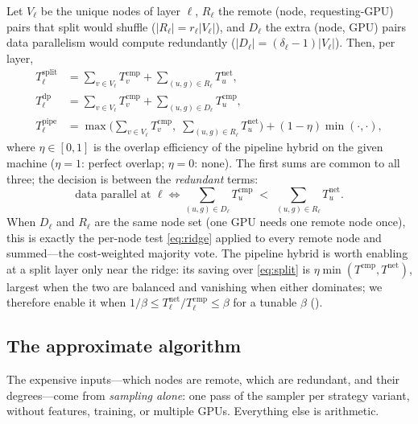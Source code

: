 Let $V_\ell$ be the unique nodes of layer $\ell$, $R_\ell$ the remote (node, requesting-GPU)
pairs that split would shuffle ($|R_\ell| = r_\ell |V_\ell|$), and $D_\ell$ the extra
(node, GPU) pairs data parallelism would compute redundantly
($|D_\ell| = (\delta_\ell - 1)|V_\ell|$). Then, per layer,
\begin{align}
  T^{\mathrm{split}}_\ell &= \sum_{v\in V_\ell} T^{\mathrm{cmp}}_v + \sum_{(u,g)\in R_\ell} T^{\mathrm{net}}_u, \label{eq:split}\\
  T^{\mathrm{dp}}_\ell    &= \sum_{v\in V_\ell} T^{\mathrm{cmp}}_v + \sum_{(u,g)\in D_\ell} T^{\mathrm{cmp}}_u, \label{eq:dp}\\
  T^{\mathrm{pipe}}_\ell  &= \max\!\Big(\sum_{v\in V_\ell} T^{\mathrm{cmp}}_v,\; \sum_{(u,g)\in R_\ell} T^{\mathrm{net}}_u\Big)
                             + (1-\eta)\min(\cdot,\cdot), \label{eq:pipe}
\end{align}
where $\eta\in[0,1]$ is the overlap efficiency of the pipeline hybrid on the given machine
($\eta{=}1$: perfect overlap; $\eta{=}0$: none). The first sums are common to all
three; the decision is between the \emph{redundant} terms:
\begin{equation}
  \text{data parallel at } \ell \iff
  \sum_{(u,g)\in D_\ell} T^{\mathrm{cmp}}_u \;<\; \sum_{(u,g)\in R_\ell} T^{\mathrm{net}}_u .
  \label{eq:layer-decision}
\end{equation}
When $D_\ell$ and $R_\ell$ are the same node set (one GPU needs one remote node once), this
is exactly the per-node test \eqref{eq:ridge} applied to every remote node and summed---the
cost-weighted majority vote. The pipeline hybrid is worth enabling at a split layer only near
the ridge: its saving over \eqref{eq:split} is $\eta\min(T^{\mathrm{cmp}},T^{\mathrm{net}})$,
largest when the two are balanced and vanishing when either dominates; we therefore enable it
when $1/\beta \le T^{\mathrm{net}}_\ell/T^{\mathrm{cmp}}_\ell \le \beta$ for a tunable
$\beta$ ().

\subsection{The approximate algorithm}
\label{sec:roofline-algo}

The expensive inputs---which nodes are remote, which are redundant, and their degrees---come
from \emph{sampling alone}: one pass of the sampler per strategy variant, without features,
training, or multiple GPUs. Everything else is arithmetic.

